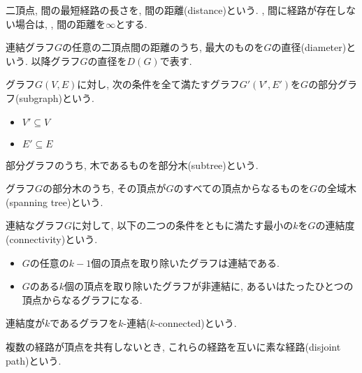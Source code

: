 \documentclass[specialreport]{subfiles}
\begin{document}
\begin{defi}
二頂点{\vu , \vv}間の最短経路の長さを{\vu , \vv}間の距離(distance)という. {\vu , \vv}間に経路が存在しない場合は, {\vu , \vv}間の距離を$\infty$とする.
\end{defi}

\begin{defi}
連結グラフ$G$の任意の二頂点間の距離のうち, 最大のものを$G$の直径(diameter)という. 以降グラフ$G$の直径を$D(G)$で表す.
\end{defi}

\begin{defi}
グラフ$G(V,E)$に対し, 次の条件を全て満たすグラフ$G'(V', E')$を$G$の部分グラフ(subgraph)という.
\begin{itemize}
\item $V' \subseteq V$
\item $E' \subseteq E$
\end{itemize}
\end{defi}


\begin{defi}
部分グラフのうち, 木であるものを部分木(subtree)という.
\end{defi}

\begin{defi}
グラフ$G$の部分木のうち, その頂点が$G$のすべての頂点からなるものを$G$の全域木(spanning tree)という.
\end{defi}

\begin{defi}
連結なグラフ$G$に対して, 以下の二つの条件をともに満たす最小の$k$を$G$の連結度(connectivity)という.
\begin{itemize}
\item $G$の任意の$k - 1$個の頂点を取り除いたグラフは連結である.
\item $G$のある$k$個の頂点を取り除いたグラフが非連結に, あるいはたったひとつの頂点からなるグラフになる.
\end{itemize}
\end{defi}

\begin{defi}
連結度が$k$であるグラフを$k$-連結($k$-connected)という.
\end{defi}


\begin{defi}
複数の経路が頂点を共有しないとき, これらの経路を互いに素な経路(disjoint path)という.
\end{defi}
\end{document}
